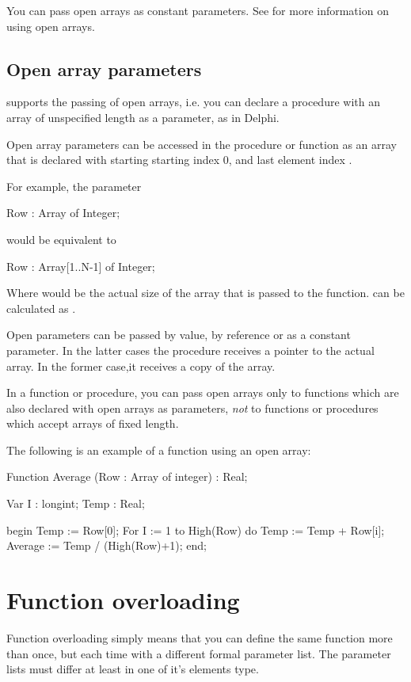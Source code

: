 \documentclass{report}
\begin{document}
You can pass open arrays as constant parameters. See  for
more information on using open arrays.

\subsection{Open array parameters}
\label{se:openarray}

\fpc supports the passing of open arrays, i.e. you can declare a procedure
with an array of unspecified length as a parameter, as in Delphi.

Open array parameters can be accessed in the procedure or function as an
array that is declared with starting starting index 0, and last element 
index .

For example, the parameter
\begin{listing}
Row : Array of Integer;
\end{listing}
would be equivalent to
\begin{listing}
Row : Array[1..N-1] of Integer;
\end{listing}
Where   would be the actual size of the array that is passed to the
function.  can be calculated as .

Open parameters can be passed by value, by reference or as a constant 
parameter. In the latter cases the procedure receives a pointer to the
actual array. In the former case,it receives a copy of the array.

In a function or procedure, you can pass open arrays only to functions which
are also declared with open arrays as parameters, {\em not} to functions or
procedures which accept arrays of fixed length.

The following is an example of a function using an open array: 

\begin{listing}
Function Average (Row : Array of integer) : Real;

Var I : longint;
    Temp : Real;

begin
  Temp := Row[0];
  For I := 1 to High(Row) do 
    Temp := Temp + Row[i];
  Average := Temp / (High(Row)+1);
end;
\end{listing}

\section{Function overloading}
Function overloading simply means that you can define the same function more
than once, but each time with a different formal parameter list.
The parameter lists must differ at least in one of it's elements type.
\end{document}
